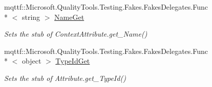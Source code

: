 \begin{DoxyCompactItemize}
mqttf\-::\-Microsoft.\-Quality\-Tools.\-Testing.\-Fakes.\-Fakes\-Delegates.\-Func\\*
$<$ string $>$ \hyperlink{class_system_1_1_runtime_1_1_remoting_1_1_contexts_1_1_fakes_1_1_stub_context_attribute_a62dec0f497a84de870fbfd8187844bf1}{Name\-Get}
\begin{DoxyCompactList}\small\item\em Sets the stub of Context\-Attribute.\-get\-\_\-\-Name()\end{DoxyCompactList}\item 
mqttf\-::\-Microsoft.\-Quality\-Tools.\-Testing.\-Fakes.\-Fakes\-Delegates.\-Func\\*
$<$ object $>$ \hyperlink{class_system_1_1_runtime_1_1_remoting_1_1_contexts_1_1_fakes_1_1_stub_context_attribute_ac3438ccdccb9b90a328e93f9c44640c0}{Type\-Id\-Get}
\begin{DoxyCompactList}\small\item\em Sets the stub of Attribute.\-get\-\_\-\-Type\-Id()\end{DoxyCompactList}\end{DoxyCompactItemize}
